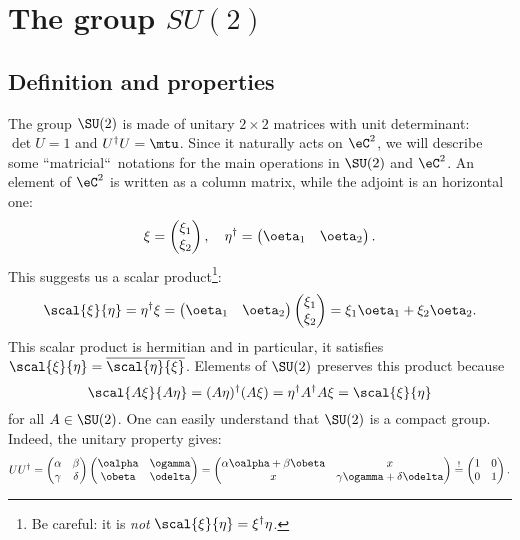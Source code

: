 \section{The group \texorpdfstring{$SU(2)$}{SU2}}

					\subsection{Definition and properties}

The group $\SU(2)$ is made of unitary $2\times 2$ matrices with unit determinant: $\det U=1$ and $U^{\dag} U=\mtu$. Since it naturally acts on $\eC^2$, we will describe some ``matricial``\ notations for the main operations in $\SU(2)$ and $\eC^2$. An element of $\eC^2$ is written as a column matrix, while the adjoint is an horizontal one:
\[
   \xi=\begin{pmatrix}
\xi_1 \\
\xi_2
\end{pmatrix},\quad
   \eta^{\dag}=\begin{pmatrix}
\oeta_1  &\oeta_2
\end{pmatrix}.
\]
This suggests us a scalar product\footnote{Be careful: it is \emph{not} $\scal{\xi}{\eta}=\xi^{\dag}\eta$.}:
\[
   \scal{\xi}{\eta}=\eta^{\dag}\xi= \begin{pmatrix}
                                     \oeta_1  &\oeta_2
                                   \end{pmatrix}
   \begin{pmatrix}
\xi_1 \\
\xi_2
\end{pmatrix}=\xi_1\oeta_1+\xi_2\oeta_2.
\]
This scalar product is hermitian and in particular, it satisfies $\scal{\xi}{\eta}=\overline{\scal{\eta}{\xi}}$. Elements of $\SU(2)$ preserves this product because
\[
   \scal{A\xi}{A\eta}=(A\eta)^{\dag}(A\xi)=\eta^{\dag} A^{\dag} A\xi=\scal{\xi}{\eta}
\]
for all $A\in\SU(2)$. One can easily understand that $\SU(2)$ is a compact group. Indeed, the unitary property gives:
\[
UU^{\dag}=
\begin{pmatrix}
\alpha & \beta \\
\gamma & \delta
\end{pmatrix}
\begin{pmatrix}
\oalpha & \ogamma \\
\obeta & \odelta
\end{pmatrix}
=
\begin{pmatrix}
\alpha\oalpha+\beta\obeta & x \\
x & \gamma\ogamma+\delta\odelta
\end{pmatrix}
\stackrel{!}{=}
\begin{pmatrix}
1  & 0 \\
0 & 1
\end{pmatrix}.
\]
